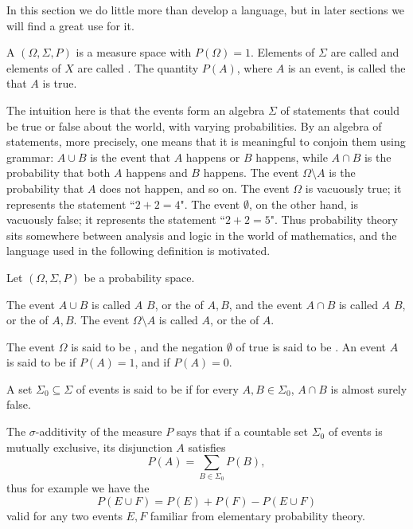 In this section we do little more than develop a language, but in later sections we will find a great use for it.

\begin{definition}
A  $(\Omega, \Sigma, P)$ is a measure space with $P(\Omega) = 1$.
Elements of $\Sigma$ are called  and elements of $X$ are called .
The quantity $P(A)$, where $A$ is an event, is called the  that $A$ is true.
\end{definition}

\begin{subsec}
The intuition here is that the events form an algebra $\Sigma$ of statements that could be true or false about the world, with varying probabilities.
By an algebra of statements, more precisely, one means that it is meaningful to conjoin them using grammar: $A \cup B$ is the event that $A$ happens or $B$ happens, while $A \cap B$ is the probability that both $A$ happens and $B$ happens. The event $\Omega \setminus A$ is the probability that $A$ does not happen, and so on.
The event $\Omega$ is vacuously true; it represents the statement ``$2 + 2 = 4$".
The event $\emptyset$, on the other hand, is vacuously false; it represents the statement ``$2 + 2 = 5$".
Thus probability theory sits somewhere between analysis and logic in the world of mathematics, and the language used in the following definition is motivated.
\end{subsec}

\begin{definition}
Let $(\Omega, \Sigma, P)$ be a probability space.

The event $A \cup B$ is called $A$  $B$, or the  of $A,B$, and the event $A \cap B$ is called $A$  $B$, or the  of $A,B$.
The event $\Omega \setminus A$ is called  $A$, or the  of $A$.

The event $\Omega$ is said to be , and the negation $\emptyset$ of true is said to be .
An event $A$ is said to be  if $P(A) = 1$, and  if $P(A) = 0$.

A set $\Sigma_0 \subseteq \Sigma$ of events is said to be  if for every $A, B \in \Sigma_0$, $A \cap B$ is almost surely false.
\end{definition}

\begin{subsec}
The $\sigma$-additivity of the measure $P$ says that if a countable set $\Sigma_0$ of events is mutually exclusive, its disjunction $A$ satisfies
$$P(A) = \sum_{B \in \Sigma_0} P(B),$$
thus for example we have the 
$$P(E \cup F) = P(E) + P(F) - P(E \cup F)$$
valid for any two events $E,F$ familiar from elementary probability theory.
\end{subsec}

